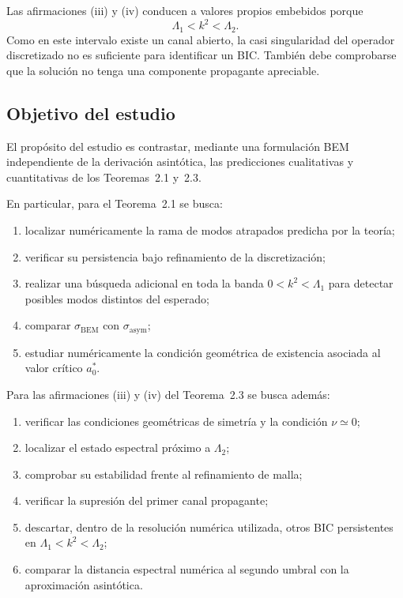 \documentclass[11pt]{article}
\begin{document}
Las afirmaciones (iii) y (iv) conducen a valores propios embebidos porque
\[
\Lambda_1<k^2<\Lambda_2.
\]
Como en este intervalo existe un canal abierto, la casi singularidad del operador discretizado no es suficiente para identificar un BIC. También debe comprobarse que la solución no tenga una componente propagante apreciable.

\subsection{Objetivo del estudio}

El propósito del estudio es contrastar, mediante una formulación BEM independiente de la derivación asintótica, las predicciones cualitativas y cuantitativas de los Teoremas~2.1 y~2.3.

En particular, para el Teorema~2.1 se busca:

\begin{enumerate}
    \item localizar numéricamente la rama de modos atrapados predicha por la teoría;
    \item verificar su persistencia bajo refinamiento de la discretización;
    \item realizar una búsqueda adicional en toda la banda
    \(0<k^2<\Lambda_1\)
    para detectar posibles modos distintos del esperado;
    \item comparar
    \(\sigma_{\mathrm{BEM}}\)
    con
    \(\sigma_{\mathrm{asym}}\);
    \item estudiar numéricamente la condición geométrica de existencia asociada al valor crítico \(a_0^*\).
\end{enumerate}

Para las afirmaciones (iii) y (iv) del Teorema~2.3 se busca además:

\begin{enumerate}
    \item verificar las condiciones geométricas de simetría y la condición \(\nu\simeq0\);
    \item localizar el estado espectral próximo a \(\Lambda_2\);
    \item comprobar su estabilidad frente al refinamiento de malla;
    \item verificar la supresión del primer canal propagante;
    \item descartar, dentro de la resolución numérica utilizada, otros BIC persistentes en
    \(\Lambda_1<k^2<\Lambda_2\);
    \item comparar la distancia espectral numérica al segundo umbral con la aproximación asintótica.
\end{enumerate}
\end{document}
